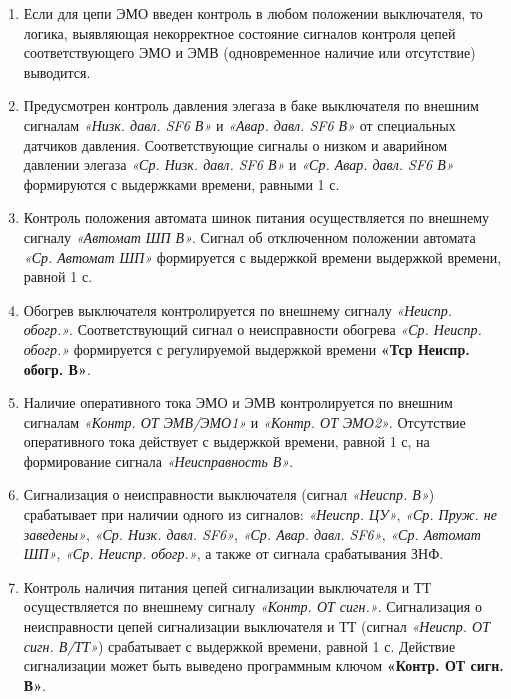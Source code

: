 \begin{enumerate}
\item
Если для цепи ЭМО введен контроль в любом положении выключателя, то логика, выявляющая некорректное состояние сигналов контроля цепей соответствующего ЭМО и ЭМВ (одновременное наличие или отсутствие) выводится.

\item
Предусмотрен контроль давления элегаза в баке выключателя по внешним сигналам \textit{«Низк. давл. SF6 В»} и \textit{«Авар. давл. SF6 В»} от специальных датчиков давления. Соответствующие сигналы о низком и аварийном давлении элегаза \textit{«Ср. Низк. давл. SF6 В»} и \textit{«Ср. Авар. давл. SF6 В»} формируются с выдержками времени, равными 1 с.

\item
Контроль положения автомата шинок питания осуществляется по внешнему сигналу \textit{«Автомат ШП В»}. Сигнал об отключенном положении автомата \textit{«Ср. Автомат ШП»} формируется с выдержкой времени выдержкой времени, равной 1 с. 

\item
Обогрев выключателя контролируется по внешнему сигналу \textit{«Неиспр. обогр.»}. Соответствующий сигнал о неисправности обогрева \textit{«Ср. Неиспр. обогр.»} формируется с регулируемой выдержкой времени \textbf{«Тср Неиспр. обогр. В»}.

\item
Наличие оперативного тока ЭМО и ЭМВ контролируется по внешним сигналам \textit{«Контр. ОТ ЭМВ/ЭМО1»} и \textit{«Контр. ОТ ЭМО2»}. Отсутствие оперативного тока действует с выдержкой времени, равной 1 с, на формирование сигнала \textit{«Неисправность В»}.

\item
Сигнализация о неисправности выключателя (сигнал \textit{«Неиспр. В»}) срабатывает при наличии одного из сигналов: \textit{«Неиспр. ЦУ»}, \textit{«Ср. Пруж. не заведены»}, \textit{«Ср. Низк. давл. SF6»}, \textit{«Ср. Авар. давл. SF6»}, \textit{«Ср. Автомат ШП»}, \textit{«Ср. Неиспр. обогр.»}, а также от сигнала срабатывания ЗНФ.

\item
Контроль наличия питания цепей сигнализации выключателя и ТТ осуществляется по внешнему сигналу \textit{«Контр. ОТ сигн.»}. Сигнализация о неисправности цепей сигнализации выключателя и ТТ (сигнал \textit{«Неиспр. ОТ сигн. В/ТТ»}) срабатывает с выдержкой времени, равной 1 с. Действие сигнализации может быть выведено программным ключом \textbf{«Контр. ОТ сигн. В»}. 




\end{enumerate}
